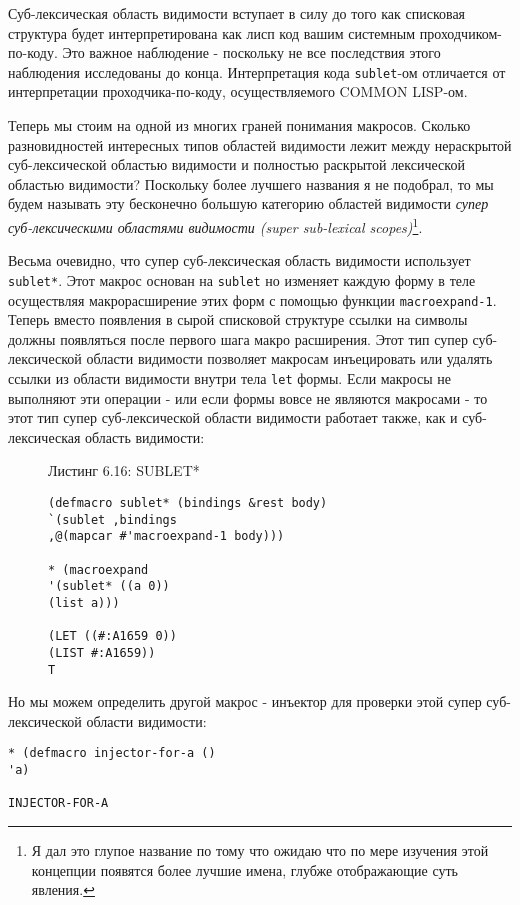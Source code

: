 Суб-лексическая область видимости вступает в силу до того как списковая структура будет интерпретирована как лисп код вашим системным проходчиком-по-коду. Это важное наблюдение - поскольку не все последствия этого наблюдения исследованы до конца. Интерпретация кода \verb"sublet"-ом отличается от интерпретации проходчика-по-коду, осуществляемого COMMON LISP-ом.

Теперь мы стоим на одной из многих граней понимания макросов. Сколько разновидностей интересных типов областей видимости лежит между нераскрытой суб-лексической областью видимости и полностью раскрытой лексической областью видимости? Поскольку более лучшего названия я не подобрал, то мы будем называть эту бесконечно большую категорию областей видимости \emph{супер суб-лексическими областями видимости (super sub-lexical scopes)}\footnote{Я дал это глупое название по тому что ожидаю что по мере изучения этой концепции появятся более лучшие имена, глубже отображающие суть явления.}.



Весьма очевидно, что супер суб-лексическая область видимости использует \verb"sublet*". Этот макрос основан на \verb"sublet" но изменяет каждую форму в теле осуществляя макрорасширение этих форм с помощью функции \verb"macroexpand-1". Теперь вместо появления в сырой списковой структуре ссылки на символы должны появляться после первого шага макро расширения. Этот тип супер суб-лексической области видимости позволяет макросам инъецировать или удалять ссылки из области видимости внутри тела \verb"let" формы. Если макросы не выполняют эти операции - или если формы вовсе не являются макросами - то этот тип супер суб-лексической области видимости работает также, как и суб-лексическая область видимости:

\begin{figure}Листинг 6.16: SUBLET*\label{listing_6.16}
\listbegin
\begin{verbatim}
(defmacro sublet* (bindings &rest body)
`(sublet ,bindings
,@(mapcar #'macroexpand-1 body)))

* (macroexpand
'(sublet* ((a 0))
(list a)))

(LET ((#:A1659 0))
(LIST #:A1659))
T
\end{verbatim}
\listend
\end{figure}

Но мы можем определить другой макрос - инъектор для проверки этой супер суб-лексической области видимости:

\begin{verbatim}* (defmacro injector-for-a ()
'a)

INJECTOR-FOR-A
\end{verbatim}

